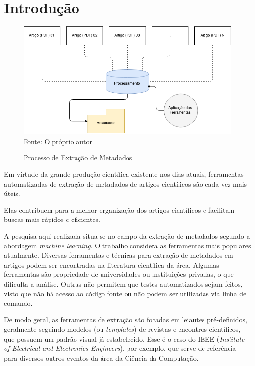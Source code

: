 
\chapter{Introdução}
\label{cha:introduction}


\begin{figure}
    \centering
    \caption{Processo de Extração de Metadados}
    \label{fig:introduction}
    \includegraphics[width=0.9\linewidth]{./assets/images/introduction}
    \center\footnotesize{Fonte: O próprio autor}
\end{figure}



Em virtude da grande produção científica existente nos dias atuais, ferramentas automatizadas de extração de metadados de artigos científicos são cada vez mais úteis.

Elas contribuem para a melhor organização dos artigos científicos e facilitam buscas mais rápidos e eficientes.

A pesquisa aqui realizada situa-se no campo da extração de metadados segundo a abordagem \textit{machine learning}. 
O trabalho considera as ferramentas mais populares atualmente. 
Diversas ferramentas e técnicas para extração de metadados em artigos podem ser encontradas na literatura científica da área. 
Algumas ferramentas são propriedade de universidades ou instituições privadas, o que dificulta a análise. 
Outras não permitem que testes automatizados sejam feitos, visto que não há acesso ao código fonte ou não podem ser utilizadas via linha de comando.

De modo geral, as ferramentas de extração são focadas em leiautes pré-definidos, geralmente seguindo modelos (ou \textit{templates}) de revistas e encontros científicos, que possuem um padrão visual já estabelecido.
Esse é o caso do IEEE (\textit{Institute of Electrical and Electronics Engineers}), por exemplo, que serve de referência para diversos outros eventos da área da Ciência da Computação.

